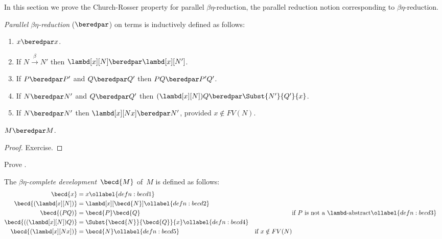 \documentclass[../../../include/open-logic-section]{subfiles}
\begin{document}

In this section we prove the Church-Rosser property for parallel
$\beta\eta$-reduction, the parallel reduction notion corresponding to
$\beta\eta$-reduction. 

\begin{defn} 
  \emph{Parallel $\beta\eta$-reduction} ($\beredpar$) on terms is
  inductively defined as follows:
  \begin{enumerate}
    \item {} $x \beredpar x$.
    \item {} If $N \xrightarrow{\beta} N'$ then $\lambd[x][N] \beredpar
      \lambd[x][N']$.
    \item {} If $P \beredpar P'$ and $Q \beredpar Q'$ then $PQ \beredpar
      P'Q'$.
    \item {} If $N \beredpar N'$ and $Q \beredpar Q'$ then
      $(\lambd[x][N])Q \beredpar \Subst{N'}{Q'}{x}$.
    \item {} If $N \beredpar N'$ then $\lambd[x][Nx]
      \beredpar N'$, provided $x \notin FV(N)$.
  \end{enumerate}
\end{defn}

\begin{thm}
  $M \beredpar M$.
\end{thm}

\begin{proof}
  Exercise.
\end{proof}

\begin{prob}
  Prove .
\end{prob}

\begin{defn}
  The \emph{$\beta\eta$-complete development}~$\becd{M}$ of~$M$ is defined
  as follows:
  \begin{align}
    \becd{x} &= x \ollabel{defn:becd1} \\
    \becd{(\lambd[x][N])} &= \lambd[x][\becd{N}] \ollabel{defn:becd2}\\
    \becd{(PQ)} &= \becd{P}\becd{Q} && \text{if $P$ is not a $\lambd$-abstract} 
    \ollabel{defn:becd3} \\
    \becd{((\lambd[x][N])Q)} &= \Subst{\becd{N}}{\becd{Q}}{x}
                             \ollabel{defn:becd4} \\
    \becd{(\lambd[x][Nx])} &= \becd{N} \ollabel{defn:becd5} & \text{if $x
                                                      \notin FV(N)$}
  \end{align}
\end{defn}
\end{document}
